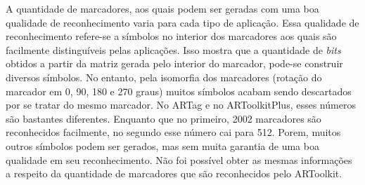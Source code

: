 		A quantidade de marcadores, aos quais podem ser geradas com uma boa qualidade de reconhecimento
		varia para cada tipo de aplicação. Essa qualidade de reconhecimento refere-se a símbolos no
		interior dos marcadores aos quais são facilmente distinguíveis pelas aplicações. Isso mostra 
		que a quantidade de \textit{bits} obtidos a partir da matriz gerada pelo interior do marcador,
		pode-se construir diversos símbolos. No entanto, pela isomorfia dos marcadores (rotação do marcador 
		em 0, 90, 180 e 270 graus) muitos símbolos acabam sendo descartados por se tratar do mesmo marcador. 
		No ARTag e no ARToolkitPlus, esses números são bastantes diferentes.
		Enquanto que no primeiro, 2002 marcadores são reconhecidos facilmente, no segundo esse número cai
		para 512. Porem, muitos outros símbolos podem ser gerados, mas sem muita garantia de uma boa
		qualidade em seu reconhecimento. Não foi possível obter as mesmas informações a respeito da
		quantidade de marcadores que são reconhecidos pelo ARToolkit.
		
	
